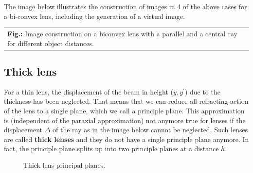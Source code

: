 \documentclass[
  a4paper,
]{book}
\begin{document}
The image below illustrates the construction of images in 4 of the above
cases for a bi-convex lens, including the generation of a virtual image.

\begin{longtable}[]{@{}
  >{\raggedright\arraybackslash}p{}@{}}
\toprule\noalign{}
\begin{minipage}[b]{\linewidth}\raggedright
\end{minipage} \\
\midrule\noalign{}
\endhead
\bottomrule\noalign{}
\endlastfoot
\textbf{Fig.:} Image construction on a biconvex lens with a parallel and
a central ray for different object distances. \\
\end{longtable}

\subsection{Thick lens}\label{thick-lens}

For a thin lens, the displacement of the beam in height
(\(y,y^{\prime}\)) due to the thickness has been neglected. That means
that we can reduce all refracting action of the lens to a single plane,
which we call a principle plane. This approximation is (independent of
the paraxial approximation) not anymore true for lenses if the
displacement \(\Delta\) of the ray as in the image below cannot be
neglected. Such lenses are called \textbf{thick lenses} and they do not
have a single principle plane anymore. In fact, the principle plane
splits up into two principle planes at a distance \(h\).

\begin{figure}


\caption{\label{fig-thick-lens-planes}Thick lens principal planes.}

\end{figure}%
\end{document}
